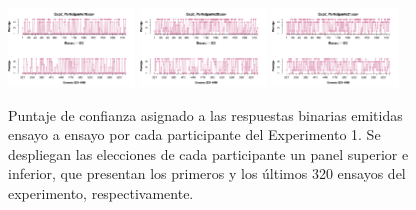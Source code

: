 \documentclass[a4paper ]{article}
\begin{document}
\begin{figure}[th]
\includegraphics[width=0.3\textwidth]{Figures/Rating_Exp2_P19} \includegraphics[width=0.3\textwidth]{Figures/Rating_Exp2_P20} \includegraphics[width=0.3\textwidth]{Figures/Rating_Exp2_P21}
\caption[Puntajes de Confianza asignados ensayo a ensayo; Experimento 2]{Puntaje de confianza asignado a las respuestas binarias emitidas ensayo a ensayo por cada participante del Experimento 1. Se despliegan las elecciones de cada participante un panel superior e inferior, que presentan los primeros y los últimos 320 ensayos del experimento, respectivamente.}
\label{fig:Rating_E2}
\end{figure}
\end{document}
